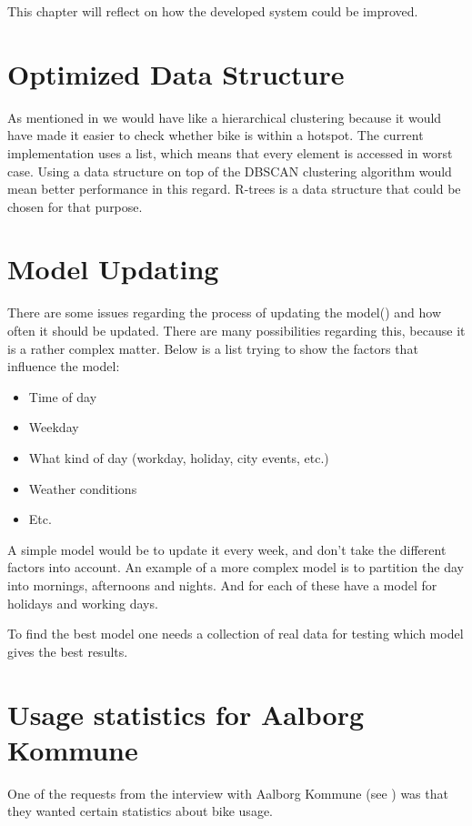This chapter will reflect on how the developed system could be improved.

\section{Optimized Data Structure}\label{ref:ods}
As mentioned in \cite{data_purporse} we would have like a hierarchical clustering because it would have made it easier to check whether bike is within a hotspot.
The current implementation uses a list, which means that every element is accessed in worst case.
Using a data structure on top of the DBSCAN clustering algorithm would mean better performance in this regard.
R-trees\cite[Section 25.3.5.3]{database_system_concepts} is a data structure that could be chosen for that purpose.

\section{Model Updating}\label{reflection:model_updating}
There are some issues regarding the process of updating the model() and how often it should be updated.
There are many possibilities regarding this, because it is a rather complex matter.
Below is a list trying to show the factors that influence the model:
\begin{itemize}
\item Time of day
\item Weekday
\item What kind of day (workday, holiday, city events, etc.)
\item Weather conditions
\item Etc.
\end{itemize}
A simple model would be to update it every week, and don't take the different factors into account.
An example of a more complex model is to partition the day into mornings, afternoons and nights.
And for each of these have a model for holidays and working days.

To find the best model one needs a collection of real data for testing which model gives the best results.

\section{Usage statistics for Aalborg Kommune}
One of the requests from the interview with Aalborg Kommune (see ) was that they wanted certain statistics about bike usage.

